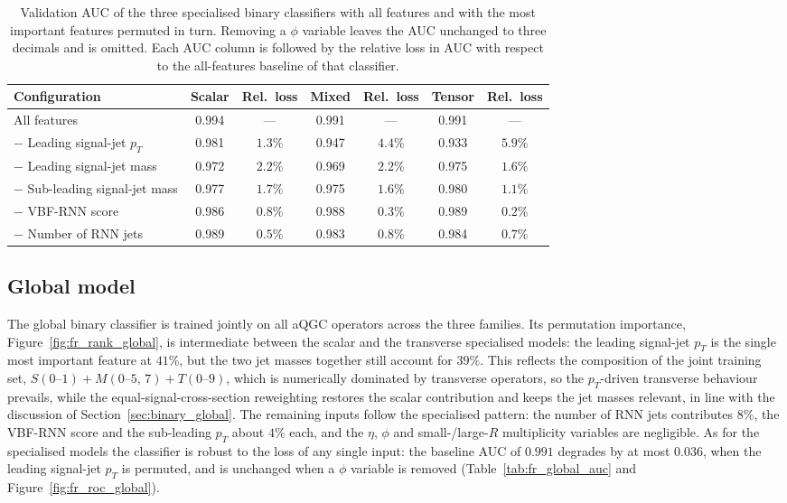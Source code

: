 \begin{table}[htbp]
  \centering
  \caption{Validation AUC of the three specialised binary classifiers with all features and with the most important features permuted in turn. Removing a $\phi$ variable leaves the AUC unchanged to three decimals and is omitted. Each AUC column is followed by the relative loss in AUC with respect to the all-features baseline of that classifier.}
  \label{tab:fr_specialised_auc}
  \begin{tabular}{|l|c|c|c|c|c|c|}
    \hline
    \textbf{Configuration} & \textbf{Scalar} & \textbf{Rel.\ loss} & \textbf{Mixed} & \textbf{Rel.\ loss} & \textbf{Tensor} & \textbf{Rel.\ loss} \\
    \hline
    All features                   & 0.994 & --- & 0.991 & --- & 0.991 & --- \\
    \hline
    $-$ Leading signal-jet $p_T$    & 0.981 & $1.3\%$ & 0.947 & $4.4\%$ & 0.933 & $5.9\%$ \\
    $-$ Leading signal-jet mass     & 0.972 & $2.2\%$ & 0.969 & $2.2\%$ & 0.975 & $1.6\%$ \\
    $-$ Sub-leading signal-jet mass & 0.977 & $1.7\%$ & 0.975 & $1.6\%$ & 0.980 & $1.1\%$ \\
    $-$ VBF-RNN score               & 0.986 & $0.8\%$ & 0.988 & $0.3\%$ & 0.989 & $0.2\%$ \\
    $-$ Number of RNN jets          & 0.989 & $0.5\%$ & 0.983 & $0.8\%$ & 0.984 & $0.7\%$ \\
    \hline
  \end{tabular}
\end{table}

\subsection{Global model}
\label{sec:fr_global}

The global binary classifier is trained jointly on all aQGC operators across the three families. Its permutation importance, Figure~\ref{fig:fr_rank_global}, is intermediate between the scalar and the transverse specialised models: the leading signal-jet $p_T$ is the single most important feature at $41\%$, but the two jet masses together still account for $39\%$. This reflects the composition of the joint training set, $S(0\text{--}1)+M(0\text{--}5,\,7)+T(0\text{--}9)$, which is numerically dominated by transverse operators, so the $p_T$-driven transverse behaviour prevails, while the equal-signal-cross-section reweighting restores the scalar contribution and keeps the jet masses relevant, in line with the discussion of Section~\ref{sec:binary_global}. The remaining inputs follow the specialised pattern: the number of RNN jets contributes $8\%$, the VBF-RNN score and the sub-leading $p_T$ about $4\%$ each, and the $\eta$, $\phi$ and small-/large-$R$ multiplicity variables are negligible. As for the specialised models the classifier is robust to the loss of any single input: the baseline AUC of $0.991$ degrades by at most $0.036$, when the leading signal-jet $p_T$ is permuted, and is unchanged when a $\phi$ variable is removed (Table~\ref{tab:fr_global_auc} and Figure~\ref{fig:fr_roc_global}).

